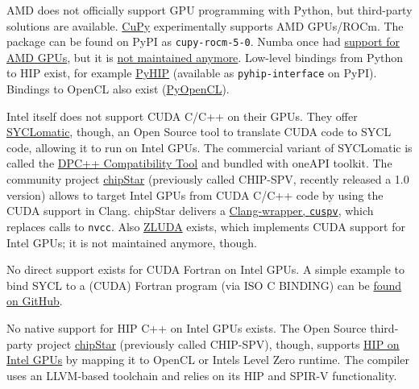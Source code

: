  AMD does not officially support GPU programming with Python, but third-party solutions are available. \href{https://docs.cupy.dev/en/latest/install.html\#using-cupy-on-amd-gpu-experimental}{CuPy} experimentally supports AMD GPUs/ROCm. The package can be found on PyPI as \texttt{cupy-rocm-5-0}. Numba once had \href{https://numba.pydata.org/numba-doc/latest/roc/index.html}{support for AMD GPUs}, but it is \href{https://numba.readthedocs.io/en/stable/release-notes.html\#version-0-54-0-19-august-2021}{not maintained anymore}. Low-level bindings from Python to HIP exist, for example \href{https://github.com/jatinx/PyHIP}{PyHIP} (available as \texttt{pyhip-interface} on PyPI). Bindings to OpenCL also exist (\href{https://documen.tician.de/pyopencl/}{PyOpenCL}).   

 Intel itself does not support CUDA C/C++ on their GPUs. They offer \href{https://github.com/oneapi-src/SYCLomatic}{SYCLomatic}, though, an Open Source tool to translate CUDA code to SYCL code, allowing it to run on Intel GPUs. The commercial variant of SYCLomatic is called the \href{https://www.intel.com/content/www/us/en/developer/tools/oneapi/dpc-compatibility-tool.html}{DPC++ Compatibility Tool} and bundled with oneAPI toolkit. The community project \href{https://github.com/CHIP-SPV/chipStar}{chipStar} (previously called CHIP-SPV, recently released a 1.0 version) allows to target Intel GPUs from CUDA C/C++ code by using the CUDA support in Clang. chipStar delivers a \href{https://github.com/CHIP-SPV/chipStar/blob/main/docs/Using.md\#compiling-cuda-application-directly-with-chipstar}{Clang-wrapper, \texttt{cuspv}}, which replaces calls to \texttt{nvcc}. Also \href{https://github.com/vosen/ZLUDA}{ZLUDA} exists, which implements CUDA support for Intel GPUs; it is not maintained anymore, though.   

 No direct support exists for CUDA Fortran on Intel GPUs. A simple example to bind SYCL to a (CUDA) Fortran program (via ISO C BINDING) can be \href{https://github.com/codeplaysoftware/SYCL-For-CUDA-Examples/tree/master/examples/fortran_interface}{found on GitHub}. 

 No native support for HIP C++ on Intel GPUs exists. The Open Source third-party project \href{https://github.com/CHIP-SPV/chipStar}{chipStar} (previously called CHIP-SPV), though, supports \href{https://github.com/CHIP-SPV/chipStar/blob/main/docs/Using.md\#compiling-a-hip-application-using-chipstar}{HIP on Intel GPUs} by mapping it to OpenCL or Intel\textquotesingle s Level Zero runtime. The compiler uses an LLVM-based toolchain and relies on its HIP and SPIR-V functionality.   


